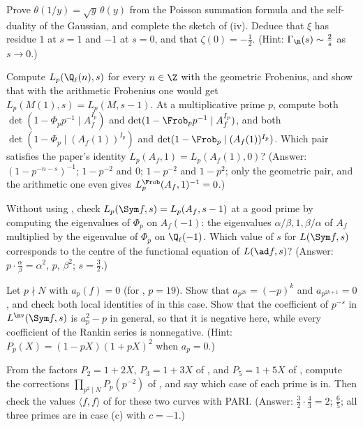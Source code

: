\begin{exercise}\label{ex:lfunctions:ex-theta}
Prove $\theta(1/y)=\sqrt y\,\theta(y)$ from the Poisson summation formula and the self-duality of the Gaussian, and complete the sketch of (iv). Deduce
that $\xi$ has residue $1$ at $s=1$ and $-1$ at $s=0$, and that $\zeta(0)=-\frac12$. (Hint: $\Gamma_\R(s)\sim\frac2s$ as $s\to0$.)
\end{exercise}

\begin{exercise}\label{ex:lfunctions:ex-frobenius}
Compute $L_p(\Q_\ell(n),s)$ for every $n\in\Z$ with the geometric Frobenius, and show that with the arithmetic Frobenius one would get $L_p(M(1),s)=L_p(M,s-1)$. At a multiplicative
prime $p$, compute both $\det(1-\Phi_pp^{-1}\mid A_f^{I_p})$ and $\det(1-\Frob_pp^{-1}\mid A_f^{I_p})$, and both $\det(1-\Phi_p\mid(A_f(1))^{I_p})$ and $\det(1-\Frob_p\mid(A_f(1))^{I_p})$. Which pair
satisfies the paper's identity $L_p(A_f,1)=L_p(A_f(1),0)$? (Answer: $(1-p^{-n-s})^{-1}$; $1-p^{-2}$ and $0$; $1-p^{-2}$ and $1-p^2$; only the geometric pair, and the arithmetic one
even gives $L_p^{\Frob}(A_f,1)^{-1}=0$.)
\end{exercise}

\begin{exercise}\label{ex:lfunctions:ex-shift}
Without using , check $L_p(\Sym f,s)=L_p(A_f,s-1)$ at a good prime by computing the eigenvalues of $\Phi_p$ on $A_f(-1)$: the eigenvalues $\alpha/\beta,1,\beta/\alpha$ of $A_f$
multiplied by the eigenvalue of $\Phi_p$ on $\Q_\ell(-1)$. Which value of $s$ for $L(\Sym f,s)$ corresponds to the centre of the functional equation of $L(\ad f,s)$? (Answer: $p\cdot\frac\alpha\beta=\alpha^2$,
$p$, $\beta^2$; $s=\frac32$.)
\end{exercise}

\begin{exercise}\label{ex:lfunctions:ex-supersingular}
Let $p\nmid N$ with $a_p(f)=0$ (for , $p=19$). Show that $a_{p^{2k}}=(-p)^k$ and $a_{p^{2k+1}}=0$, and check both local identities of  in
this case. Show that the coefficient of $p^{-s}$ in $L^{\nv}(\Sym f,s)$ is $a_p^2-p$ in general, so that it is negative here, while every coefficient of the Rankin series is
nonnegative. (Hint: $P_p(X)=(1-pX)(1+pX)^2$ when $a_p=0$.)
\end{exercise}

\begin{exercise}\label{ex:lfunctions:ex-corrections}
From the factors $P_2=1+2X$, $P_3=1+3X$ of , and $P_5=1+5X$ of , compute the corrections $\prod_{p^2\mid N}P_p(p^{-2})$ of ,
and say which case of  each prime is in. Then check the values $\langle f,f\rangle$ of  for these two curves with PARI.
(Answer: $\frac32\cdot\frac43=2$; $\frac65$; all three primes are in case (c) with $c=-1$.)
\end{exercise}

